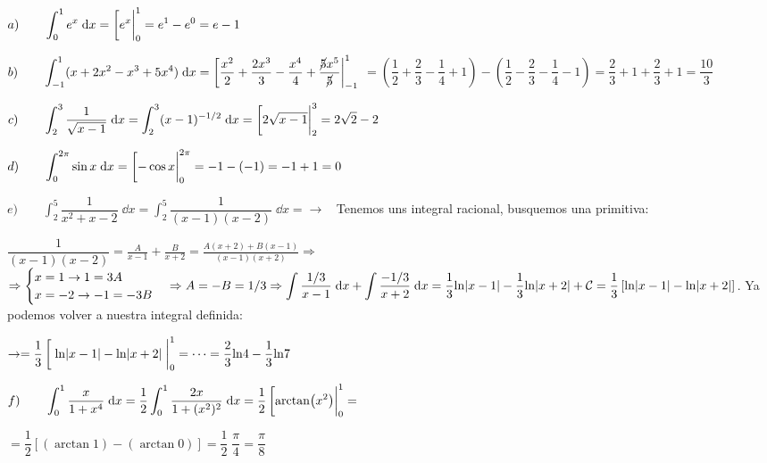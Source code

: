 \begin{proofw}\renewcommand{\qedsymbol}{$\diamond$}	


\hspace{5mm} $a) \qquad \displaystyle \int_0^1 e^x \; \dd x = \eval[e^x|_0^1=e^1-e^0=e-1$

$b) \qquad \displaystyle \int_{-1}^1 (x+2x^2-x^3+5x^4) \; \dd x= \eval[ \dfrac {x^2}{2}+\dfrac {2x^3}{3}-\dfrac {x^4}{4}+\dfrac {\cancel{5}x^5}{\cancel{5}}|_{-1}^1  $
$=\left(\dfrac 1 2 + \dfrac  2 3 - \dfrac 1 4 +1 \right) - \left( \dfrac 1 2- \dfrac  2 3 - \dfrac  1 4 - 1   \right)= \dfrac 2 3 + 1 + \dfrac  2 3 + 1 = \dfrac {10} {3}$

$c) \qquad \displaystyle \int_2^3 \dfrac {1}{\sqrt{x-1}} \; \dd x =  \int_2^3 (x-1)^{-1/2} \; \dd x = \eval[2\sqrt{x-1}|_2^3 = 2\sqrt{2}-2$

$d) \qquad \displaystyle \int_0^{2\pi} \sin x \; \dd x= 
\eval[-\cos x|_0^{2\pi}= -1-(-1)=-1+1=0$

$e) \qquad \displaystyle \int_2^5 \dfrac {1}{x^2+x-2} \; \dd x = \displaystyle \int_2^5 \dfrac {1}{(x-1)(x-2)} \; \dd x = \to \; \;$	Tenemos uns integral racional, busquemos una primitiva:

$\displaystyle \dfrac {1}{(x-1)(x-2)}=\frac{A}{x-1}+\frac{B}{x+2}=\frac{A(x+2)+B(x-1)}{(x-1)(x+2)} \Rightarrow $
$\displaystyle \Rightarrow \begin{cases}
 	x=1 \to 1=3A \\
 	x=-2\to -1=-3B	
 \end{cases} \Rightarrow A=-B=1/3 \Rightarrow \int \dfrac {1/3}{x-1}\; \dd x +\int \dfrac {-1/3}{x+2} \; \dd x = \frac 1 3 \mathrm{ln}|x-1| -\frac{1}{3} \mathrm{ln} \abs{x+2} + \mathcal C= \frac 1 3 \left[\mathrm{ln}|x-1|-\mathrm{ln} \abs{x+2}   \right]$. Ya podemos volver a nuestra integral definida:
 
$\to = \displaystyle  \frac 1 3\eval[\;\mathrm{ln} \abs{x-1} - \mathrm{ln} \abs{x+2}\; |_0^1= \cdots = \frac 2 3 \mathrm{ln} 4 - \frac 1 3 \mathrm{ln} 7$

$f) \qquad \displaystyle \int_0^1 \dfrac {x}{1+x^4} \; \dd x = \dfrac 1 2 \int_0^1 \dfrac {2x}{1+(x^2)^2} \; \dd x =
\dfrac 1 2 \eval[\arctan(x^2)|_0^1 =$

$= \dfrac 1 2 \left[ (\arctan 1)-(\arctan 0)  \right]=\dfrac 1 2 \; \dfrac {\pi}{4} =  \dfrac {\pi}{8}$
\end{proofw}

